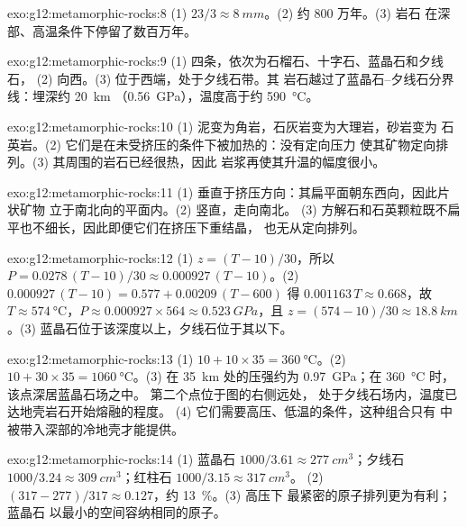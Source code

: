\begin{solution}{exo:g12:metamorphic-rocks:8}
(1) $23/3 \approx \qty{8}{mm}$。(2) 约 800 万年。(3) 岩石
在深部、高温条件下停留了数百万年。
\end{solution}

\begin{solution}{exo:g12:metamorphic-rocks:9}
(1) 四条，依次为石榴石、十字石、蓝晶石和夕线石，
(2) 向西。(3) 位于西端，处于夕线石带。其
岩石越过了蓝晶石–夕线石分界线：埋深约 \qty{20}{km}
（\qty{0.56}{GPa}），温度高于约 \qty{590}{\celsius}。
\end{solution}

\begin{solution}{exo:g12:metamorphic-rocks:10}
(1) 泥变为角岩，石灰岩变为大理岩，砂岩变为
石英岩。(2) 它们是在未受挤压的条件下被加热的：没有定向压力
使其矿物定向排列。(3) 其周围的岩石已经很热，因此
岩浆再使其升温的幅度很小。
\end{solution}

\begin{solution}{exo:g12:metamorphic-rocks:11}
(1) 垂直于挤压方向：其扁平面朝东西向，因此片状矿物
立于南北向的平面内。(2) 竖直，走向南北。
(3) 方解石和石英颗粒既不扁平也不细长，因此即便它们在挤压下重结晶，
也无从定向排列。
\end{solution}

\begin{solution}{exo:g12:metamorphic-rocks:12}
(1) $z = (T - 10)/30$，所以 $P = 0.0278\,(T - 10)/30 \approx
0.000927\,(T - 10)$。(2) $0.000927\,(T - 10) = 0.577 + 0.00209\,(T - 600)$
得 $0.001163\,T \approx 0.668$，故 $T \approx \qty{574}{\celsius}$，$P
\approx 0.000927 \times 564 \approx \qty{0.523}{GPa}$，且 $z = (574 - 10)/30
\approx \qty{18.8}{km}$。(3) 蓝晶石位于该深度以上，夕线石位于其以下。
\end{solution}

\begin{solution}{exo:g12:metamorphic-rocks:13}
(1) $10 + 10 \times 35 = \qty{360}{\celsius}$。(2) $10 + 30 \times 35 =
\qty{1060}{\celsius}$。(3) 在 \qty{35}{km} 处的压强约为
\qty{0.97}{GPa}；在 \qty{360}{\celsius} 时，该点深居蓝晶石场之中。
第二个点位于图的右侧远处，
处于夕线石场内，温度已达地壳岩石开始熔融的程度。
(4) 它们需要高压、低温的条件，这种组合只有
中被带入深部的冷地壳才能提供。
\end{solution}

\begin{solution}{exo:g12:metamorphic-rocks:14}
(1) 蓝晶石 $1000/3.61 \approx \qty{277}{cm^3}$；夕线石 $1000/3.24
\approx \qty{309}{cm^3}$；红柱石 $1000/3.15 \approx \qty{317}{cm^3}$。
(2) $(317 - 277)/317 \approx 0.127$，约 \qty{13}{\percent}。(3) 高压下
最紧密的原子排列更为有利；蓝晶石
以最小的空间容纳相同的原子。
\end{solution}

